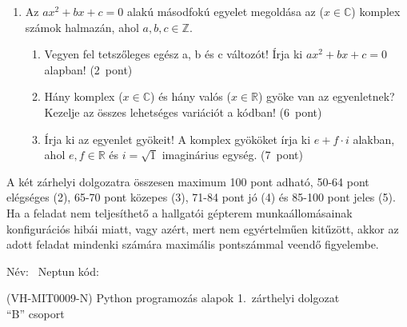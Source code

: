 \documentclass[a4paper,12pt]{letter}
\begin{document}
\begin{enumerate}
\begin{enumerate}
 \end{enumerate}
\item Az $a x^2+b x + c = 0$ alakú másodfokú egyelet megoldása az ($x \in \mathbb{C}$) komplex számok halmazán, ahol $a, b, c \in \mathbb{Z}$.
  \begin{enumerate}
  \item Vegyen fel tetszőleges egész a, b és c változót! Írja ki $a x^2+b x + c = 0$ alapban! \hfill (2~pont)
  \item Hány komplex ($x\in\mathbb{C}$) és hány valós ($x\in\mathbb{R}$) gyöke van az egyenletnek? Kezelje az összes lehetséges variációt a kódban! \hfill (6~pont)
  \item Írja ki az egyenlet gyökeit! A komplex gyököket írja ki $e+f \cdot i$ alakban, ahol $e, f \in \mathbb{R}$ és $i=\sqrt{1}$ imaginárius egység. \hfill (7~pont)
  \end{enumerate}
 \end{enumerate}

A két zárhelyi dolgozatra összesen maximum 100 pont adható, 50-64 pont elégséges (2), 65-70 pont közepes (3), 71-84 pont jó (4) és 85-100 pont jeles (5). Ha a feladat nem teljesíthető a hallgatói gépterem munkaállomásainak konfigurációs hibái miatt, vagy azért, mert nem egyértelműen kitűzött, akkor az adott feladat mindenki számára maximális pontszámmal veendő figyelembe.

\bigskip


\vfill

\newpage

Név: \hrulefill\ Neptun kód: \hrulefill

\begin{center}
 (VH-MIT0009-N) Python programozás alapok 1.~zárthelyi dolgozat\\
 \smallskip
 ``B'' csoport
 \end{center}
\end{document}
